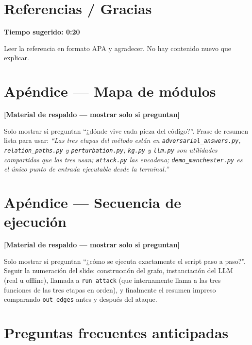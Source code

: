 \documentclass[11pt]{article}
\newcommand{\tiempo}[1]{{\small\color{timecolor}\textbf{Tiempo sugerido: #1}}\par\vspace{0.3em}}
\newcommand{\respaldo}{{\small\color{cutcolor}\textbf{[Material de respaldo --- mostrar solo si preguntan]}}\par\vspace{0.3em}}
\begin{document}
\section{Referencias / Gracias}
\tiempo{0:20}
Leer la referencia en formato APA y agradecer. No hay contenido nuevo que explicar.

\section{Apéndice --- Mapa de módulos}
\respaldo
Solo mostrar si preguntan ``¿dónde vive cada pieza del código?''. Frase de resumen lista
para usar: \emph{``Las tres etapas del método están en \texttt{adversarial\_answers.py},
\texttt{relation\_paths.py} y \texttt{perturbation.py}; \texttt{kg.py} y \texttt{llm.py} son
utilidades compartidas que las tres usan; \texttt{attack.py} las encadena;
\texttt{demo\_manchester.py} es el único punto de entrada ejecutable desde la
terminal.''}

\section{Apéndice --- Secuencia de ejecución}
\respaldo
Solo mostrar si preguntan ``¿cómo se ejecuta exactamente el script paso a paso?''. Seguir la
numeración del slide: construcción del grafo, instanciación del LLM (real u offline),
llamada a \texttt{run\_attack} (que internamente llama a las tres funciones de las tres
etapas en orden), y finalmente el resumen impreso comparando \texttt{out\_edges} antes y
después del ataque.

\section*{Preguntas frecuentes anticipadas}
\end{document}

